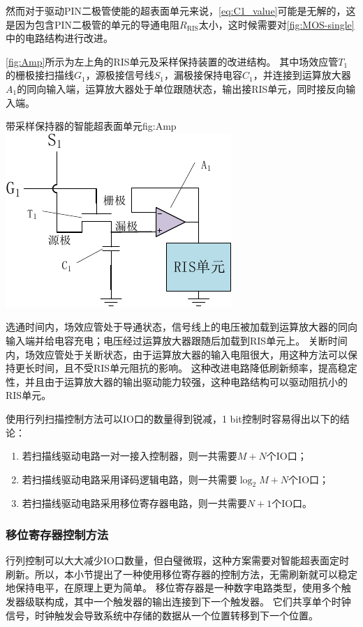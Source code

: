 \documentclass[supercite]{HustGraduPaper}
\begin{document}
然而对于驱动PIN二极管使能的超表面单元来说，\autoref{eq:C1_value}可能是无解的，这是因为包含PIN二极管的单元的导通电阻$R_\mathrm{RIS}$太小，这时候需要对\autoref{fig:MOS-single}中的电路结构进行改进。

\autoref{fig:Amp}所示为左上角的RIS单元及采样保持装置的改进结构。
其中场效应管$T_1$的栅极接扫描线$G_1$，源极接信号线$S_1$，漏极接保持电容$C_1$，并连接到运算放大器$A_1$的同向输入端，运算放大器处于单位跟随状态，输出接RIS单元，同时接反向输入端。

\begin{generalfig}[htb]{带采样保持器的智能超表面单元}{fig:Amp}
	\includegraphics[width=0.4\linewidth]{Figures/Amp.pdf}
\end{generalfig}

选通时间内，场效应管处于导通状态，信号线上的电压被加载到运算放大器的同向输入端并给电容充电；电压经过运算放大器跟随后加载到RIS单元上。
关断时间内，场效应管处于关断状态，由于运算放大器的输入电阻很大，用这种方法可以保持更长时间，且不受RIS单元阻抗的影响。
这种改进电路降低刷新频率，提高稳定性，并且由于运算放大器的输出驱动能力较强，这种电路结构可以驱动阻抗小的RIS单元。

使用行列扫描控制方法可以IO口的数量得到锐减，1 bit控制时容易得出以下的结论：
\begin{enumerate}
	\item 若扫描线驱动电路一对一接入控制器，则一共需要$M+N$个IO口；
	\item 若扫描线驱动电路采用译码逻辑电路，则一共需要$\log_{2}{M}+N$个IO口；
	\item 若扫描线驱动电路采用移位寄存器电路，则一共需要$N+1$个IO口。
\end{enumerate}

\subsubsection{移位寄存器控制方法}

行列控制可以大大减少IO口数量，但白璧微瑕，这种方案需要对智能超表面定时刷新。所以，本小节提出了一种使用移位寄存器的控制方法，无需刷新就可以稳定地保持电平，在原理上更为简单。
移位寄存器是一种数字电路类型，使用多个触发器级联构成，其中一个触发器的输出连接到下一个触发器。
它们共享单个时钟信号，时钟触发会导致系统中存储的数据从一个位置转移到下一个位置。
\end{document}

